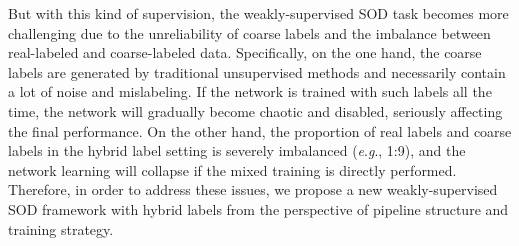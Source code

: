 \documentclass[journal]{IEEEtran}
\newcommand{\eg}{\textit{e}.\textit{g}.}
\begin{document}
But with this kind of supervision, the weakly-supervised SOD task becomes more challenging due to the unreliability of coarse labels and the imbalance between real-labeled and coarse-labeled data.
Specifically, on the one hand, the coarse labels are generated by traditional unsupervised methods and necessarily contain a lot of noise and mislabeling.
If the network is trained with such labels all the time, the network will gradually become chaotic and disabled, seriously affecting the final performance.
On the other hand, the proportion of real labels and coarse labels in the hybrid label setting is severely imbalanced (\eg, 1:9), and the network learning will collapse if the mixed training is directly performed. Therefore, in order to address these issues, we propose a new weakly-supervised SOD framework with hybrid labels from the perspective of pipeline structure and training strategy.
\end{document}
